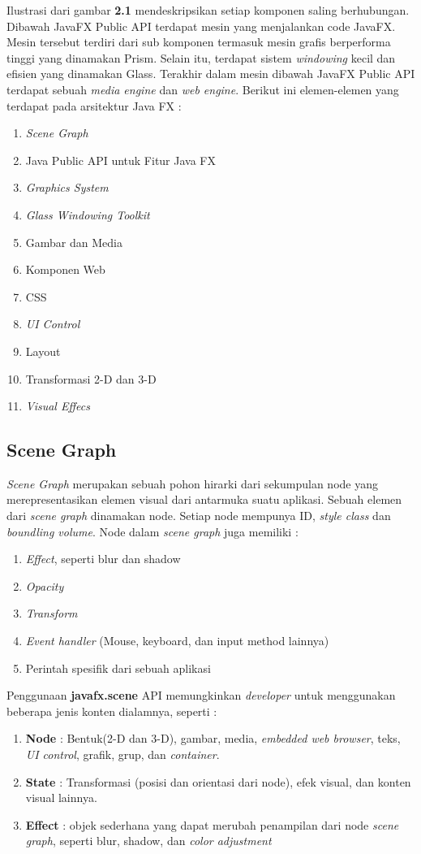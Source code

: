 Ilustrasi dari gambar \textbf{2.1} mendeskripsikan setiap komponen saling berhubungan. Dibawah JavaFX Public API terdapat mesin yang menjalankan code JavaFX. Mesin tersebut terdiri dari sub komponen termasuk mesin grafis berperforma tinggi yang dinamakan Prism. Selain itu, terdapat sistem \textit{windowing} kecil dan efisien yang dinamakan Glass. Terakhir dalam mesin dibawah JavaFX Public API terdapat sebuah \textit{media engine} dan \textit{web engine}. Berikut ini elemen-elemen yang terdapat pada arsitektur Java FX : \cite{javafx}
\begin{enumerate}
	\item \textit{Scene Graph}
	\item Java Public API untuk Fitur Java FX
	\item \textit{Graphics System}
	\item \textit{Glass Windowing Toolkit}
	\item Gambar dan Media
	\item Komponen Web
	\item CSS
	\item \textit{UI Control}
	\item Layout
	\item Transformasi 2-D dan 3-D
	\item \textit{Visual Effecs}
\end{enumerate}

\subsection{Scene Graph}
\label{subs:Scene_Graph}
\textit{Scene Graph} merupakan sebuah pohon hirarki dari sekumpulan node yang merepresentasikan elemen visual dari antarmuka suatu aplikasi. Sebuah elemen dari \textit{scene graph} dinamakan node. Setiap node mempunya ID, \textit{style class} dan \textit{boundling volume}. Node dalam \textit{scene graph} juga memiliki :\cite{javafx}
\begin{enumerate}
	\item \textit{Effect}, seperti blur dan shadow
	\item \textit{Opacity}
	\item \textit{Transform}
	\item \textit{Event handler} (Mouse, keyboard, dan input method lainnya)
	\item Perintah spesifik dari sebuah aplikasi
\end{enumerate} 

Penggunaan \textbf{javafx.scene} API memungkinkan \textit{developer} untuk menggunakan beberapa jenis konten dialamnya, seperti : \cite{javafx}
\begin{enumerate}
	\item \textbf{Node} : Bentuk(2-D dan 3-D), gambar, media, \textit{embedded web browser}, teks, \textit{UI control}, grafik, grup, dan \textit{container}.
	\item \textbf{State} : Transformasi (posisi dan orientasi dari node), efek visual, dan konten visual lainnya.
	\item \textbf{Effect} : objek sederhana yang dapat merubah penampilan dari node \textit{scene graph}, seperti blur, shadow, dan \textit{color adjustment}
\end{enumerate}

